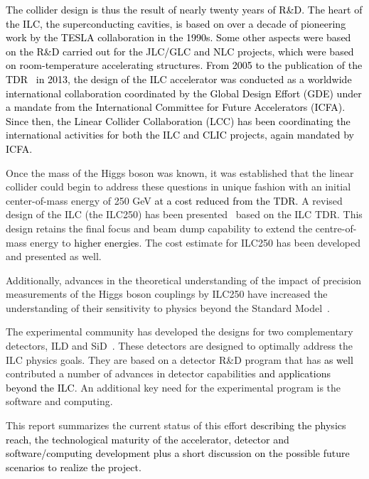 \documentclass[%
 reprint,
 amsmath,amssymb,
 aps,
]{revtex4-1}
\newcommand{\juan}[1]{\textcolor{black}{{#1}}}
\newcommand{\jim}[1]{\textcolor{black}{#1}}
\begin{document}
\juan{ The collider design is thus the result of nearly twenty years of R\&D. The heart of the ILC, the superconducting cavities, is based on over a decade of pioneering work by the TESLA collaboration in the 1990s. Some other aspects were based on the R\&D carried out for the JLC/GLC and NLC projects, which were based on room-temperature accelerating structures. From 2005 to the publication of the TDR~\cite{Behnke:2013xla} in 2013, the design of the ILC accelerator was conducted as a worldwide international collaboration coordinated by the Global Design Effort (GDE) under a mandate from the International Committee for Future Accelerators (ICFA).
Since then, the Linear Collider Collaboration (LCC) has been coordinating the international activities for both the ILC and CLIC projects, again mandated by ICFA.}


Once the mass of the Higgs boson was known, it was established that the
linear collider could begin to address these questions in unique fashion
with an initial center-of-mass energy of 250 GeV \jim{at a cost reduced from the TDR.}
A revised design of the ILC (the ILC250) has been presented~\cite{Evans:2017rvt}
based on the ILC TDR.  This design retains the final focus and beam dump
capability to extend the centre-of-mass energy to \juan{higher energies}.  The cost estimate for ILC250 has 
been developed and presented as well.

Additionally, advances in the theoretical understanding of the impact of precision
measurements of the Higgs boson couplings by ILC250 have increased the understanding
of their sensitivity to physics beyond the Standard Model~\cite{Barklow:2017suo,Fujii:2017vwa}. 

The experimental community has developed the designs for two complementary detectors,
ILD and SiD~\cite{Behnke:2013lya}.  These detectors are designed to optimally address the
ILC physics goals.  They are based on a detector R\&D program that has \juan{as well}
contributed a number of advances in detector capabilities \juan{and applications beyond the ILC}.
An additional key need for the experimental program is the software and computing.

This report summarizes the current status of this effort \juan{describing the physics reach, the technological maturity of the accelerator, detector and software/computing development plus a short discussion on the possible future scenarios to realize the project.} 
\end{document}
